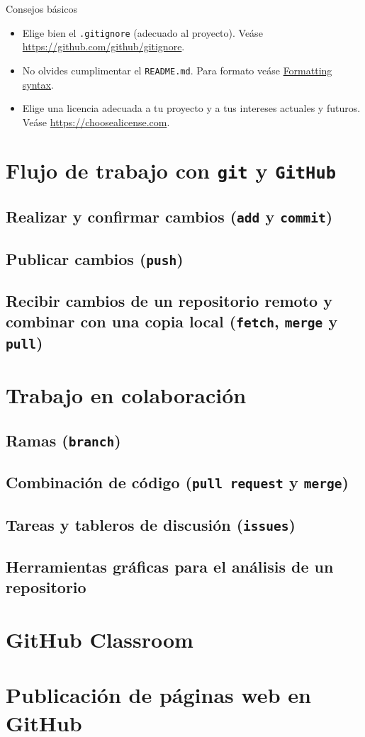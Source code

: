 \documentclass[xcolor={usenames,svgnames,dvipsnames}]{beamer}
\begin{document}
\begin{frame}[fragile,label={sec:org07cf12c}]{Consejos básicos}
 \begin{itemize}
\item Elige bien el \texttt{.gitignore} (adecuado al proyecto). Veáse \url{https://github.com/github/gitignore}.
\item No olvides cumplimentar el \texttt{README.md}. Para formato veáse \href{https://help.github.com/articles/basic-writing-and-formatting-syntax/}{Formatting syntax}.
\item Elige una licencia adecuada a tu proyecto y a tus intereses actuales y futuros. Veáse \url{https://choosealicense.com}.
\end{itemize}
\end{frame}

\section{Flujo de trabajo con \texttt{git} y \texttt{GitHub}}
\label{sec:orgb5c40f5}
\subsection{Realizar y confirmar cambios (\texttt{add} y \texttt{commit})}
\label{sec:orgaddeecc}
\subsection{Publicar cambios (\texttt{push})}
\label{sec:org0c6c607}
\subsection{Recibir cambios de un repositorio remoto y combinar con una copia local (\texttt{fetch}, \texttt{merge} y \texttt{pull})}
\label{sec:org88b5c09}
\section{Trabajo en colaboración}
\label{sec:org88a95ed}
\subsection{Ramas (\texttt{branch})}
\label{sec:orga477602}
\subsection{Combinación de código (\texttt{pull request} y \texttt{merge})}
\label{sec:org22d8e5d}
\subsection{Tareas y tableros de discusión (\texttt{issues})}
\label{sec:orgf8b0102}
\subsection{Herramientas gráficas para el análisis de un repositorio}
\label{sec:org1595c41}
\section{GitHub Classroom}
\label{sec:org08ba361}
\section{Publicación de páginas web en GitHub}
\label{sec:org7dd0b85}
\end{document}
